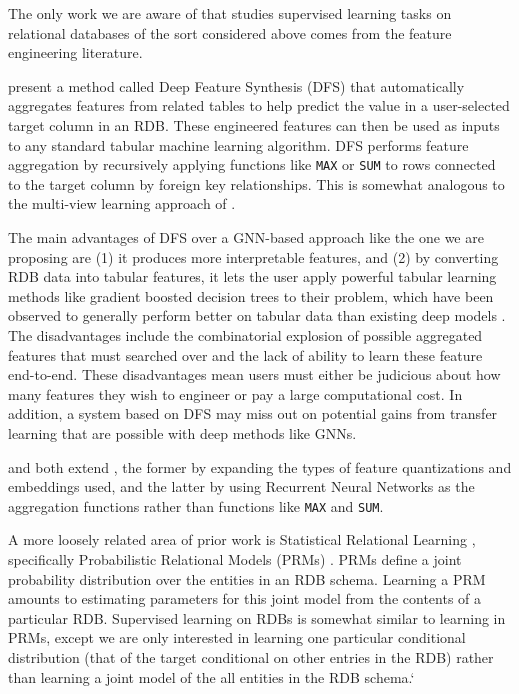 \documentclass{article}
\begin{document}
The only work we are aware of that studies supervised learning tasks on relational databases of the sort considered above comes from the feature engineering literature. 

\citet{kanter_deep_2015} present a method called Deep Feature Synthesis (DFS) that automatically aggregates features from related tables to help predict the value in a user-selected target column in an RDB.  These engineered features can then be used as inputs to any standard tabular machine learning algorithm.  DFS performs feature aggregation by recursively applying functions like \texttt{MAX} or \texttt{SUM} to rows connected to the target column by foreign key relationships.  This is somewhat analogous to the multi-view learning approach of \cite{guo_multirelational_2008}.  

The main advantages of DFS over a GNN-based approach like the one we are proposing are (1) it produces more interpretable features, and (2) by converting RDB data into tabular features, it lets the user apply powerful tabular learning methods like gradient boosted decision trees \citep{ke2017lightgbm} to their problem, which have been observed to generally perform better on tabular data than existing deep models \citep{arik2019tabnet}.  The disadvantages include the combinatorial explosion of possible aggregated features that must searched over and the lack of ability to learn these feature end-to-end.  These disadvantages mean users must either be judicious about how many features they wish to engineer or pay a large computational cost.  In addition, a system based on DFS may miss out on potential gains from transfer learning that are possible with deep methods like GNNs. 

\citet{lam_one_2017} and \citet{lam_neural_2018} both extend \cite{kanter_deep_2015}, the former by expanding the types of feature quantizations and embeddings used, and the latter by using Recurrent Neural Networks as the aggregation functions rather than functions like \texttt{MAX} and \texttt{SUM}.

A more loosely related area of prior work is Statistical Relational Learning \citep{getoor_introduction_2007}, specifically Probabilistic Relational Models  (PRMs) \citep{koller2007introduction}.  PRMs define a joint probability distribution over the entities in an RDB schema.  Learning a PRM amounts to estimating parameters for this joint model from the contents of a particular RDB.  Supervised learning on RDBs is somewhat similar to learning in PRMs, except we are only interested in learning one particular conditional distribution (that of the target conditional on other entries in the RDB) rather than learning a joint model of the all entities in the RDB schema.`
\end{document}
